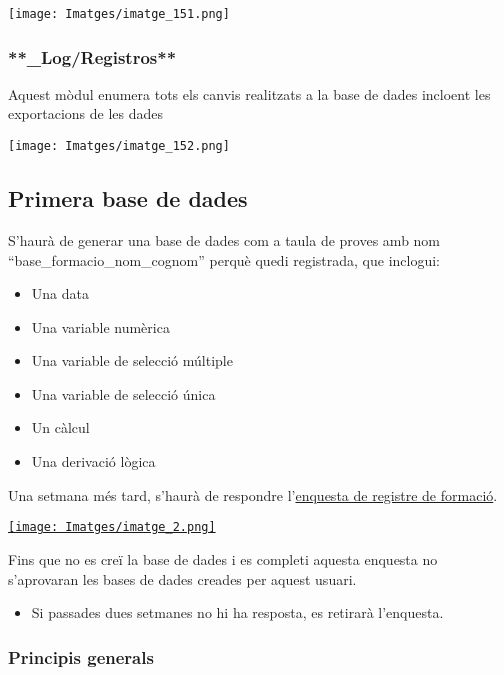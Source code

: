\documentclass[
]{article}
\providecommand{\tightlist}{%
  \setlength{\itemsep}{0pt}\setlength{\parskip}{0pt}}
\begin{document}
\texttt{[image: Imatges/imatge\_151.png]}

\hypertarget{logregistros}{%
\subsubsection{**\_Log/Registros**}\label{logregistros}}

Aquest mòdul enumera tots els canvis realitzats a la base de dades incloent les exportacions de les dades

\texttt{[image: Imatges/imatge\_152.png]}

\hypertarget{primera-base-de-dades}{%
\subsection{\texorpdfstring{\textbf{Primera base de dades}}{Primera base de dades}}\label{primera-base-de-dades}}

S'haurà de generar una base de dades com a taula de proves amb nom ``base\_formacio\_nom\_cognom'' perquè quedi registrada, que inclogui:

\begin{itemize}
\tightlist
\item
  Una data
\item
  Una variable numèrica
\item
  Una variable de selecció múltiple
\item
  Una variable de selecció única
\item
  Un càlcul
\item
  Una derivació lògica
\end{itemize}

Una setmana més tard, s'haurà de respondre l'\href{http://j.mp/2XLjGuK}{enquesta de registre de formació}.

\href{http://j.mp/2XLjGuK}{\texttt{[image: Imatges/imatge\_2.png]}}

Fins que no es creï la base de dades i es completi aquesta enquesta no s'aprovaran les bases de dades creades per aquest usuari.

\begin{itemize}
\tightlist
\item
  Si passades dues setmanes no hi ha resposta, es retirarà l'enquesta.
\end{itemize}

\hypertarget{en7}{%
\subsubsection{\texorpdfstring{\textbf{Principis generals}}{Principis generals}}\label{en7}}
\end{document}
